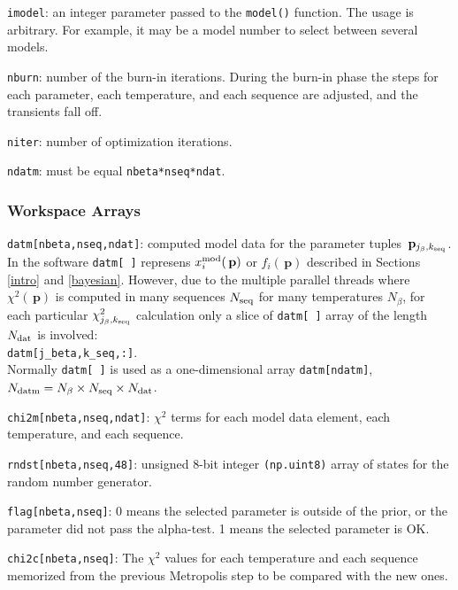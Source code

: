\documentclass[preprint2]{aastex}
\newcommand{\bfp}{\,\mathbf{p}}
\begin{document}
\verb|imodel|: an integer parameter passed to the \verb|model()| function. The usage is
        arbitrary. For example, it may be a model number to select between
        several models.

\verb|nburn|: number of the burn-in iterations. During the burn-in phase the steps
       for each parameter, each temperature, and each sequence are adjusted,
       and the transients fall off.

\verb|niter|: number of optimization iterations.

\verb|ndatm|: must be equal \verb|nbeta*nseq*ndat|.



\subsubsection{Workspace Arrays}

\verb|datm[nbeta,nseq,ndat]|: computed model data for the parameter tuples 
							  $\bfp_{j_\beta, k_{\rm seq}}$. 
							  In the software \verb|datm[ ]|
							  represens $x^{\rm mod}_i(\bfp)$ or $f_i(\bfp)$ described
							  in Sections \ref{intro} and \ref{bayesian}. However,
							  due to the multiple parallel threads where $\chi^2(\bfp)$
							  is computed  in many sequences $N_{\rm seq}$ for many 
							  temperatures $N_\beta$, for each particular 
							  $\chi^2_{j_\beta, k_{\rm seq}}$ calculation only a slice 
							  of \verb|datm[ ]| array of the length $N_{\rm dat}$ is
							  involved: \\
							  \verb|datm[j_beta,k_seq,:]|. \\
							  Normally \verb|datm[ ]| is used as a one-dimensional
							  array \verb|datm[ndatm]|, 
							  $N_{\rm datm} = N_\beta \times N_{\rm seq} \times N_{\rm dat}$.

\verb|chi2m[nbeta,nseq,ndat]|: $\chi^2$ terms for each model data element, each
                        temperature, and each sequence.

\verb|rndst[nbeta,nseq,48]|: unsigned 8-bit integer \verb|(np.uint8)| array of states
                      for the random number generator.

\verb|flag[nbeta,nseq]|: 0 means the selected parameter is outside of the prior,
                  or the parameter did not pass the alpha-test.
                  1 means the selected parameter is OK.
                  
\verb|chi2c[nbeta,nseq]|: The $\chi^2$ values for each temperature and each sequence 
                          memorized from the previous Metropolis step to be compared
                          with the new ones.
\end{document}
